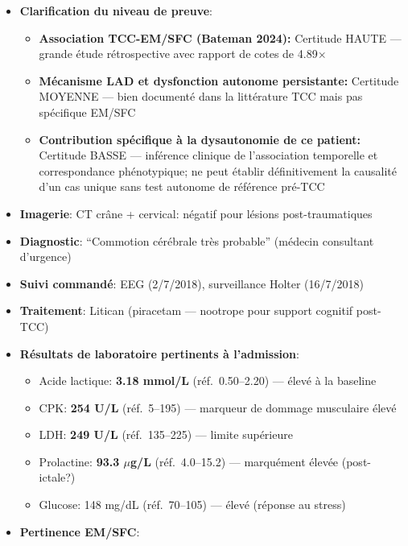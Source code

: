 \begin{description}
\begin{itemize}
\begin{itemize}
            \item \textbf{Clarification du niveau de preuve}:
            \begin{itemize}
                \item \textbf{Association TCC-EM/SFC (Bateman 2024):} Certitude HAUTE --- grande étude rétrospective avec rapport de cotes de 4.89$\times$
                \item \textbf{Mécanisme LAD et dysfonction autonome persistante:} Certitude MOYENNE --- bien documenté dans la littérature TCC mais pas spécifique EM/SFC
                \item \textbf{Contribution spécifique à la dysautonomie de ce patient:} Certitude BASSE --- inférence clinique de l'association temporelle et correspondance phénotypique; ne peut établir définitivement la causalité d'un cas unique sans test autonome de référence pré-TCC
            \end{itemize}
            \item \textbf{Imagerie}: CT crâne + cervical: négatif pour lésions post-traumatiques
            \item \textbf{Diagnostic}: ``Commotion cérébrale très probable'' (médecin consultant d'urgence)
            \item \textbf{Suivi commandé}: EEG (2/7/2018), surveillance Holter (16/7/2018)
            \item \textbf{Traitement}: Litican (piracetam --- nootrope pour support cognitif post-TCC)
            \item \textbf{Résultats de laboratoire pertinents à l'admission}:
            \begin{itemize}
                \item Acide lactique: \textbf{3.18 mmol/L} (réf.\ 0.50--2.20) --- élevé à la baseline
                \item CPK: \textbf{254 U/L} (réf.\ 5--195) --- marqueur de dommage musculaire élevé
                \item LDH: \textbf{249 U/L} (réf.\ 135--225) --- limite supérieure
                \item Prolactine: \textbf{93.3 $\mu$g/L} (réf.\ 4.0--15.2) --- marquément élevée (post-ictale?)
                \item Glucose: 148 mg/dL (réf.\ 70--105) --- élevé (réponse au stress)
            \end{itemize}
            \item \textbf{Pertinence EM/SFC}:
            \begin{itemize}

\end{itemize}
\end{itemize}
\end{itemize}
\end{description}
